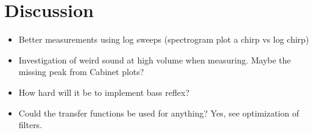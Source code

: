 
\chapter{Discussion}
\label{sec:discussion}
\begin{itemize}
	\item Better measurements using log sweeps (spectrogram plot a chirp vs log chirp)
	\item Investigation of weird sound at high volume when measuring. Maybe the missing peak from Cabinet plots?
	\item How hard will it be to implement bass reflex?
	\item Could the transfer functions be used for anything? Yes, see optimization of filters.
\end{itemize}